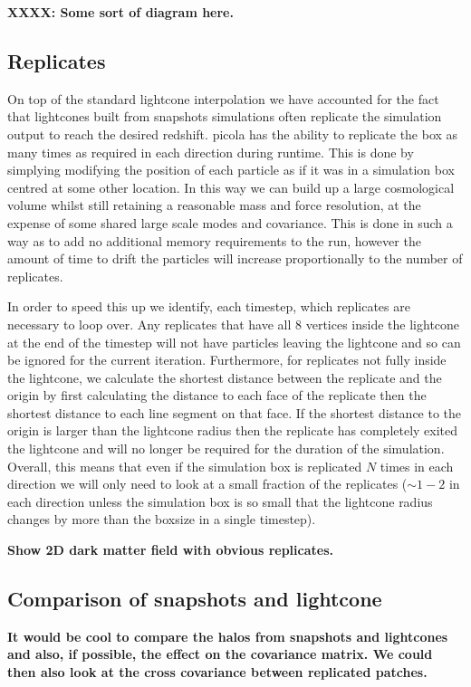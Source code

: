 \documentclass[5p,authoryear]{elsarticle}
\begin{document}
\textbf{XXXX: Some sort of diagram here.}

\subsection{Replicates}

On top of the standard lightcone interpolation we have accounted for the fact that lightcones built from snapshots simulations often replicate the simulation output to reach the desired redshift. {\sc picola} has the ability to replicate the box as many times as required in each direction during runtime. This is done by simplying modifying the position of each particle as if it was in a simulation box centred at some other location. In this way we can build up a large cosmological volume whilst still retaining a reasonable mass and force resolution, at the expense of some shared large scale modes and covariance. This is done in such a way as to add no additional memory requirements to the run, however the amount of time to drift the particles will increase proportionally to the number of replicates. 

In order to speed this up we identify, each timestep, which replicates are necessary to loop over. Any replicates that have all 8 vertices inside the lightcone at the end of the timestep will not have particles leaving the lightcone and so can be ignored for the current iteration. Furthermore, for replicates not fully inside the lightcone, we calculate the shortest distance between the replicate and the origin by first calculating the distance to each face of the replicate then the shortest distance to each line segment on that face. If the shortest distance to the origin is larger than the lightcone radius then the replicate has completely exited the lightcone and will no longer be required for the duration of the simulation. Overall, this means that even if the simulation box is replicated $N$ times in each direction we will only need to look at a small fraction of the replicates ($\sim1-2$ in each direction unless the simulation box is so small that the lightcone radius changes by more than the boxsize in a single timestep).

\textbf{Show 2D dark matter field with obvious replicates.}

\subsection{Comparison of snapshots and lightcone}

\textbf{It would be cool to compare the halos from snapshots and lightcones and also, if possible, the effect on the covariance matrix. We could then also look at the cross covariance between replicated patches.}
\end{document}
